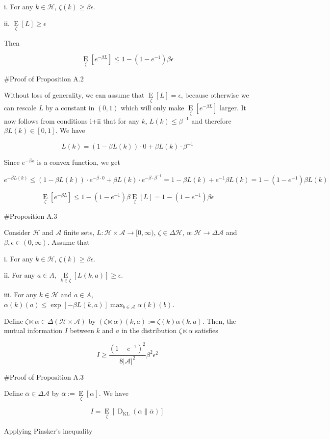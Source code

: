 \documentclass[a4paper]{article}
\newcommand{\E}[1]{\underset{#1}{\operatorname{E}}}
\newcommand{\KL}[2]{\operatorname{D}_{\mathrm{KL}}(#1 \| #2)}
\newcommand{\Abs}[1]{\lvert #1 \rvert}
\newcommand{\A}{\mathcal{A}}
\newcommand{\Hy}{\mathcal{H}}
\begin{document}
i. For any $k \in \Hy$, $\zeta(k) \geq \beta\epsilon$.

ii. $\E{\zeta}[L] \geq \epsilon$

Then

$$\E{\zeta}[e^{-\beta L}] \leq 1 - (1 - e^{-1})\beta\epsilon$$

\#Proof of Proposition A.2

Without loss of generality, we can assume that $\E\zeta[L] = \epsilon$, because otherwise we can rescale $L$ by a constant in $(0,1)$ which will only make $\E{\zeta}[e^{-\beta L}]$ larger. It now follows from conditions i+ii that for any $k$, $L(k) \leq \beta^{-1}$ and therefore $\beta L(k) \in [0,1]$. We have

$$L(k) = (1 - \beta L(k)) \cdot 0 + \beta L(k) \cdot \beta^{-1}$$

Since $e^{-\beta x}$ is a convex function, we get

$$e^{-\beta L(k)} \leq (1 - \beta L(k)) \cdot e^{-\beta \cdot 0} + \beta L(k) \cdot e^{-\beta \cdot \beta^{-1}} = 1 - \beta L(k) + e^{-1} \beta L(k) = 1-(1-e^{-1})\beta L(k)$$

$$\E\zeta[e^{-\beta L}] \leq 1-(1-e^{-1})\beta \E\zeta[L] = 1-(1-e^{-1})\beta\epsilon$$

\#Proposition A.3

Consider $\Hy$ and $\A$ finite sets, $L: \Hy \times \A \rightarrow [0,\infty)$, $\zeta \in \Delta\Hy$, $\alpha: \Hy \rightarrow \Delta\A$ and $\beta,\epsilon \in (0,\infty)$. Assume that

i. For any $k \in \Hy$, $\zeta(k) \geq \beta\epsilon$.

ii. For any $a \in A$, $\E{k \in \zeta}[L(k,a)] \geq \epsilon$.

iii. For any $k \in \Hy$ and $a \in A$, $\alpha(k)(a) \leq \exp[-\beta L(k,a)] \max_{b \in \A} \alpha(k)(b)$.

Define $\zeta \ltimes \alpha \in \Delta(\Hy \times \A)$ by $(\zeta \ltimes \alpha)(k,a):=\zeta(k)\alpha(k,a)$. Then,  the mutual information $I$ between $k$ and $a$ in the distribution $\zeta \ltimes \alpha$ satisfies

$$I \geq \frac{(1-e^{-1})^2}{8\Abs{\A}^2} \beta^2 \epsilon^2$$

\#Proof of Proposition A.3

Define $\bar{\alpha} \in \Delta\A$ by $\bar{\alpha}:=\E\zeta[\alpha]$. We have

$$I = \E{\zeta}[\KL{\alpha}{\bar{\alpha}}]$$

Applying Pinsker's inequality
\end{document}
